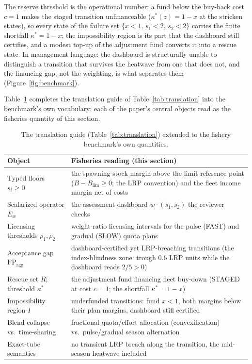 \documentclass[3p,11pt]{elsarticle}
\begin{document}
The reserve threshold is the operational number: a fund below
the buy-back cost \(c = 1\) makes the staged transition
unfinanceable (\(\kappa^*(z) = 1 - x\) at the stricken states), so every
state of the failure set \(\{x < 1,\, s_1 < 2,\, s_2 < 2\}\) carries
the finite shortfall \(\kappa^* = 1 - x\); the impossibility region is
its part that the dashboard still certifies, and a modest top-up of the
adjustment fund converts it into a rescue state. In
management language: the dashboard is structurally unable to distinguish a
transition that survives the heatwave from one that does not, and the
financing gap, not the weighting, is what separates them
(Figure~\ref{fig:benchmark}).

\medskip

\noindent Table~\ref{tab:fisheries} completes the translation guide of
Table~\ref{tab:translation} into the benchmark's own vocabulary: each of
the paper's central objects read as the fisheries quantity of this
section.

\begin{table}[htbp]
\centering
\small
\caption{The translation guide (Table~\ref{tab:translation}) extended to
the fishery benchmark's own quantities.}
\label{tab:fisheries}
\begin{tabular}{@{}p{4.1cm}p{9.4cm}@{}}
\toprule
Object & Fisheries reading (this section) \\
\midrule
Typed floors \(s_i \ge 0\) & the spawning-stock margin above the limit reference point (\(B - B_{\mathrm{lim}} \ge 0\); the LRP convention) and the fleet income margin net of costs \\
Scalarized operator \(E_w\) & the assessment dashboard \(w \cdot (s_1, s_2)\) the reviewer checks \\
Licensing thresholds \(\rho_1, \rho_2\) & weight-ratio licensing intervals for the pulse (FAST) and gradual (SLOW) quota plans \\
Acceptance gap \(\mathrm{FP}_{\mathrm{agg}}\) & dashboard-certified yet LRP-breaching transitions (the index-blindness zone: trough \(0.6\) LRP units while the dashboard reads \(2/5 > 0\)) \\
Rescue set \(R\); threshold \(\kappa^*\) & the adjustment fund financing fleet buy-down (STAGED at cost \(c = 1\); the shortfall \(\kappa^* = 1 - x\)) \\
Impossibility region \(I\) & underfunded transitions: fund \(x < 1\), both margins below their plan margins, dashboard still certified \\
Blend collapse vs.\ time-sharing & fractional quota/effort allocation (convexification) vs.\ pulse/gradual season alternation \\
Exact-tube semantics & no transient LRP breach along the transition, the mid-season heatwave included \\
\bottomrule
\end{tabular}
\end{table}
\end{document}
